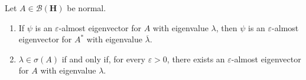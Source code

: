 \begin{lemma}
    \label{lmm:hall-10.25}
    \leanok
    Let $A \in \mathcal{B}(\mathbf{H})$ be normal.
    \begin{enumerate}
        \item If $\psi$ is an $\varepsilon$-almost eigenvector for $A$ with eigenvalue $\lambda$, then $\psi$ is an $\varepsilon$-almost eigenvector for $A^*$ with eigenvalue $\overline\lambda$.
        \item $\lambda \in \sigma(A)$ if and only if, for every $\varepsilon > 0$, there exists an $\varepsilon$-almost eigenvector for $A$ with eigenvalue $\lambda$.
    \end{enumerate}
\end{lemma}
